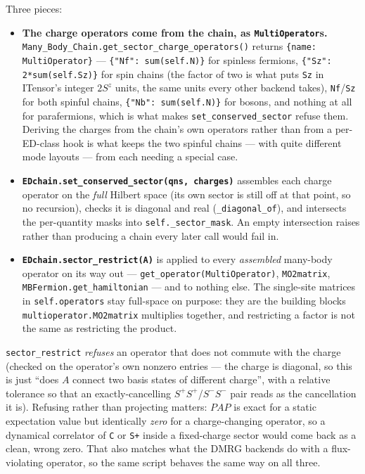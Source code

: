 \documentclass[11pt]{article}
\begin{document}
Three pieces:

\begin{itemize}
\item \textbf{The charge operators come from the chain, as
  \texttt{MultiOperator}s.}
  \texttt{Many\_Body\_Chain.get\_sector\_charge\_operators()} returns
  \texttt{\{name: MultiOperator\}} --- \texttt{\{"Nf": sum(self.N)\}}
  for spinless fermions, \texttt{\{"Sz": 2*sum(self.Sz)\}} for spin
  chains (the factor of two is what puts \texttt{Sz} in ITensor's integer
  $2S^z$ units, the same units every other backend takes),
  \texttt{Nf}/\texttt{Sz} for both spinful chains,
  \texttt{\{"Nb": sum(self.N)\}} for bosons, and nothing at all for
  parafermions, which is what makes \texttt{set\_conserved\_sector}
  refuse them. Deriving the charges from the chain's own operators rather
  than from a per-ED-class hook is what keeps the two spinful chains ---
  with quite different mode layouts --- from each needing a special case.
\item \textbf{\texttt{EDchain.set\_conserved\_sector(qns, charges)}}
  assembles each charge operator on the \emph{full} Hilbert space (its own
  sector is still off at that point, so no recursion), checks it is
  diagonal and real (\texttt{\_diagonal\_of}), and intersects the
  per-quantity masks into \texttt{self.\_sector\_mask}. An empty
  intersection raises rather than producing a chain every later call would
  fail in.
\item \textbf{\texttt{EDchain.sector\_restrict(A)}} is applied to every
  \emph{assembled} many-body operator on its way out ---
  \texttt{get\_operator(MultiOperator)}, \texttt{MO2matrix},
  \texttt{MBFermion.get\_hamiltonian} --- and to nothing else. The
  single-site matrices in \texttt{self.operators} stay full-space on
  purpose: they are the building blocks
  \texttt{multioperator.MO2matrix} multiplies together, and restricting a
  factor is not the same as restricting the product.
\end{itemize}

\texttt{sector\_restrict} \emph{refuses} an operator that does not
commute with the charge (checked on the operator's own nonzero entries ---
the charge is diagonal, so this is just ``does $A$ connect two basis states
of different charge'', with a relative tolerance so that an
exactly-cancelling $S^+S^+$/$S^-S^-$ pair reads as the cancellation it
is). Refusing rather than projecting matters: $PAP$ is exact for a static
expectation value but identically \emph{zero} for a charge-changing
operator, so a dynamical correlator of \texttt{C} or \texttt{S+} inside a
fixed-charge sector would come back as a clean, wrong zero. That also
matches what the DMRG backends do with a flux-violating operator, so the
same script behaves the same way on all three.
\end{document}
